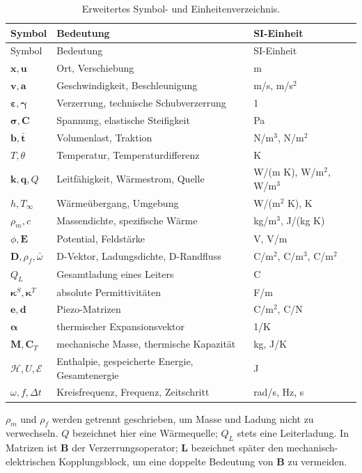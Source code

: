 \begin{longtable}{lll}
\caption{Erweitertes Symbol- und Einheitenverzeichnis.}\label{tab:symbols}\\
\toprule Symbol & Bedeutung & SI-Einheit\\\midrule\endfirsthead
\toprule Symbol & Bedeutung & SI-Einheit\\\midrule\endhead
$\mathbf x,\mathbf u$ & Ort, Verschiebung & m\\
$\mathbf v,\mathbf a$ & Geschwindigkeit, Beschleunigung & m/s, m/s$^2$\\
$\boldsymbol\varepsilon,\boldsymbol\gamma$ & Verzerrung, technische Schubverzerrung & 1\\
$\boldsymbol\sigma,\mathbf C$ & Spannung, elastische Steifigkeit & Pa\\
$\mathbf b,\bar{\mathbf t}$ & Volumenlast, Traktion & N/m$^3$, N/m$^2$\\
$T,\theta$ & Temperatur, Temperaturdifferenz & K\\
$\mathbf k,\mathbf q,Q$ & Leitfähigkeit, Wärmestrom, Quelle & W/(m K), W/m$^2$, W/m$^3$\\
$h,T_\infty$ & Wärmeübergang, Umgebung & W/(m$^2$ K), K\\
$\rho_m,c$ & Massendichte, spezifische Wärme & kg/m$^3$, J/(kg K)\\
$\phi,\mathbf E$ & Potential, Feldstärke & V, V/m\\
$\mathbf D,\rho_f,\bar\omega$ & D-Vektor, Ladungsdichte, D-Randfluss & C/m$^2$, C/m$^3$, C/m$^2$\\
$Q_L$ & Gesamtladung eines Leiters & C\\
$\boldsymbol\kappa^S,\boldsymbol\kappa^T$ & absolute Permittivitäten & F/m\\
$\mathbf e,\mathbf d$ & Piezo-Matrizen & C/m$^2$, C/N\\
$\boldsymbol\alpha$ & thermischer Expansionsvektor & 1/K\\
$\mathbf M,\mathbf C_T$ & mechanische Masse, thermische Kapazität & kg, J/K\\
$\mathcal H,U,\mathcal E$ & Enthalpie, gespeicherte Energie, Gesamtenergie & J\\
$\omega,f,\Delta t$ & Kreisfrequenz, Frequenz, Zeitschritt & rad/s, Hz, s\\
\bottomrule
\end{longtable}
$\rho_m$ und $\rho_f$ werden getrennt geschrieben, um Masse und Ladung nicht zu
verwechseln. $Q$ bezeichnet hier eine Wärmequelle; $Q_L$ stets eine Leiterladung.
In Matrizen ist $\mathbf B$ der Verzerrungsoperator; $\mathbf L$ bezeichnet
später den mechanisch-elektrischen Kopplungsblock, um eine doppelte Bedeutung
von $\mathbf B$ zu vermeiden.


